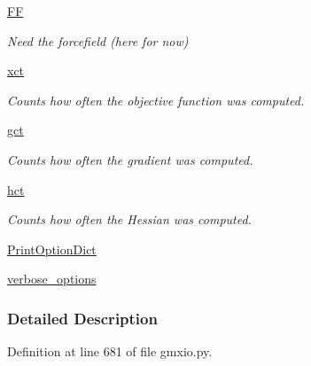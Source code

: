 \begin{DoxyCompactItemize}
\hyperlink{classforcebalance_1_1target_1_1Target_a38a37919783141ea37fdcf8b00ce0aaf}{F\-F}
\begin{DoxyCompactList}\small\item\em Need the forcefield (here for now) \end{DoxyCompactList}\item 
\hyperlink{classforcebalance_1_1target_1_1Target_aad2e385cfbf7b4a68f1c2cb41133fe82}{xct}
\begin{DoxyCompactList}\small\item\em Counts how often the objective function was computed. \end{DoxyCompactList}\item 
\hyperlink{classforcebalance_1_1target_1_1Target_aa625ac88c6744eb14ef281d9496d0dbb}{gct}
\begin{DoxyCompactList}\small\item\em Counts how often the gradient was computed. \end{DoxyCompactList}\item 
\hyperlink{classforcebalance_1_1target_1_1Target_a5b5a42f78052b47f29ed4b940c6111a1}{hct}
\begin{DoxyCompactList}\small\item\em Counts how often the Hessian was computed. \end{DoxyCompactList}\item 
\hyperlink{classforcebalance_1_1BaseClass_afc6659278497d7245bc492ecf405ccae}{Print\-Option\-Dict}
\item 
\hyperlink{classforcebalance_1_1BaseClass_afd68efa29ccd2f320f4cf82198214aac}{verbose\-\_\-options}
\end{DoxyCompactItemize}


\subsubsection{Detailed Description}


Definition at line 681 of file gmxio.\-py.



